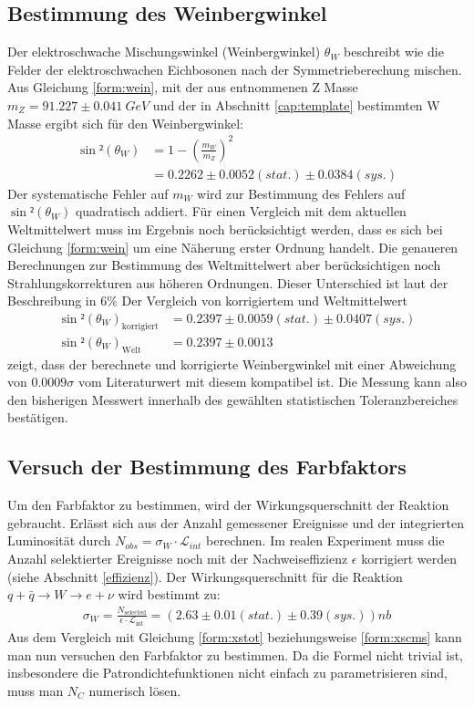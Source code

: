 \documentclass[a4paper,12pt]{article}
\begin{document}
\subsection{Bestimmung des Weinbergwinkel}
Der elektroschwache Mischungswinkel (Weinbergwinkel) $\theta_{W}$ beschreibt wie die Felder der elektroschwachen Eichbosonen nach der Symmetrieberechung mischen.
Aus Gleichung \ref{form:wein}, mit der aus \cite{versuchsanleitung} entnommenen Z Masse
$m_{Z}=91.227 \pm \SI{0.041}{GeV}$ und der in Abschnitt \ref{cap:template} bestimmten W Masse ergibt
sich für den Weinbergwinkel:
\begin{align*}
	\sin²\left(\theta_{W}\right) &= 1 - \left(\frac{m_{W}}{m_{Z}}\right)^{2} \\
	&=  0.2262 ± 0.0052 (stat.) ± 0.0384(sys.)
\end{align*}
Der systematische Fehler auf $m_{W}$ wird zur Bestimmung des Fehlers auf $\sin²(\theta_{W})$ quadratisch addiert.
Für einen Vergleich mit dem aktuellen Weltmittelwert muss im Ergebnis noch berücksichtigt werden,
dass es sich bei Gleichung \ref{form:wein} um eine
Näherung erster Ordnung handelt. Die genaueren Berechnungen zur Bestimmung des Weltmittelwert aber berücksichtigen noch Strahlungskorrekturen aus höheren
Ordnungen. Dieser Unterschied ist laut der Beschreibung in \cite{versuchsanleitung} $6\%$
Der Vergleich von korrigiertem und Weltmittelwert
\begin{align*}
	\sin²(\theta_{W})_\text{korrigiert} &=  0.2397 ± 0.0059 (stat.) ± 0.0407(sys.) \\
	\sin²(\theta_{W})_\text{Welt} &= 0.2397 \pm 0.0013
\end{align*}
zeigt, dass der berechnete und korrigierte Weinbergwinkel mit einer Abweichung von $0.0009\sigma$ vom Literaturwert mit diesem
 kompatibel ist. Die Messung kann also den bisherigen Messwert innerhalb des gewählten statistischen
Toleranzbereiches bestätigen.


\subsection{Versuch der Bestimmung des Farbfaktors}
Um den Farbfaktor zu bestimmen, wird der Wirkungsquerschnitt der Reaktion gebraucht.
Erlässt sich aus der Anzahl gemessener Ereignisse und der
integrierten Luminosität durch $N_{obs}=\sigma_W \cdot \mathcal{L}_{int}$ berechnen. Im realen Experiment
muss die Anzahl selektierter Ereignisse noch mit der Nachweiseffizienz $\epsilon$
korrigiert werden (siehe Abschnitt \ref{effizienz}).
Der Wirkungsquerschnitt für die Reaktion $q+\bar{q}\rightarrow W \rightarrow e+ \nu$ wird bestimmt zu:
\begin{align*}
	\sigma_W = \frac{N_\text{selected}}{\epsilon \cdot \mathcal{L}_\text{int}} = ( 2.63 ± 0.01 (stat.) ± 0.39(sys.)) \si{nb}
\end{align*}
Aus dem Vergleich mit Gleichung \ref{form:xstot} beziehungsweise \ref{form:xscms} kann man nun
versuchen den Farbfaktor zu bestimmen. Da die Formel nicht trivial ist, insbesondere die
Patrondichtefunktionen nicht einfach zu parametrisieren sind, muss man $N_C$ numerisch lösen.
\end{document}
